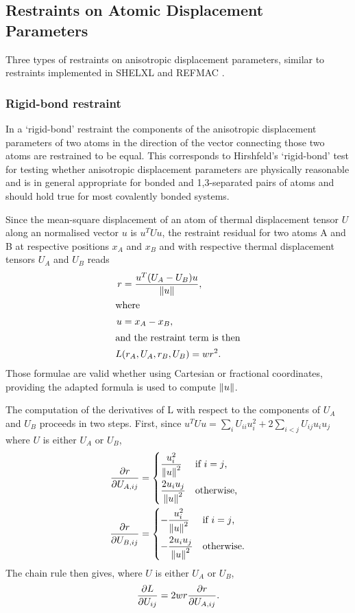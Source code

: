 \documentclass[pdf]{iucr}
\begin{document}
\subsection{Restraints on Atomic Displacement Parameters}

Three types of restraints on anisotropic displacement parameters, similar to restraints implemented in SHELXL \cite{Sheldrick:2008aa} and REFMAC \cite{Murshudov:1999aa}.

\subsubsection{Rigid-bond restraint}

In a `rigid-bond' restraint the components of the anisotropic displacement parameters of two atoms in the direction of the vector connecting those two atoms are restrained to be equal. This corresponds to Hirshfeld's `rigid-bond' test \cite{Hirshfeld:1976aa} for testing whether anisotropic displacement parameters are physically reasonable \cite{Sheldrick:1997aa} and is in general appropriate for bonded and 1,3-separated pairs of atoms and should hold true for most covalently bonded systems.

Since the mean-square displacement of an atom of thermal displacement tensor $U$ along an normalised vector $u$ is $u^T U u$, the restraint residual for two atoms A and B at respective positions $x_A$ and $x_B$ and with respective thermal displacement tensors $U_A$ and $U_B$ reads
\begin{align}
\label{eqn:rigid_bond}
r &= \frac{u^T (U_A - U_B) u}{\left\| u \right\|},\\
\intertext{where}
u &= x_A - x_B, \\
\intertext{and the restraint term is then}
L&(r_A, U_A, r_B, U_B) = w r^2.
\end{align}
Those formulae are valid whether using Cartesian or fractional coordinates, providing the adapted formula is used to compute $\left\| u \right\|$.

The computation of the derivatives of L with respect to the components of $U_A$ and $U_B$ proceeds in two steps. First, since $u^T U u = \sum_i U_{ii} u_i^2 + 2\sum_{i<j} U_{ij}u_i u_j$ where $U$ is either $U_A$ or $U_B$, 
\begin{align}
\frac{\partial r}{\partial U_{A,ij}} &= \begin{cases}
 \displaystyle \frac{u_i^2}{\left\| u \right\|^2} & \text{if $i=j$,}\\[1em]
 \displaystyle \frac{2u_i u_j}{\left\| u \right\|^2} & \text{otherwise,}
 \end{cases}\\
\frac{\partial r}{\partial U_{B,ij}} &= \begin{cases}
 \displaystyle -\frac{u_i^2}{\left\| u \right\|^2} & \text{if $i=j$,}\\[1em]
 \displaystyle -\frac{2u_i u_j}{\left\| u \right\|^2} & \text{otherwise.}
 \end{cases}
\end{align}
The chain rule then gives, where $U$ is either $U_A$ or $U_B$,
\begin{equation}
\frac{\partial L}{\partial U_{ij}} = 2wr \frac{\partial r}{\partial U_{A,ij}}.
\end{equation}
\end{document}
